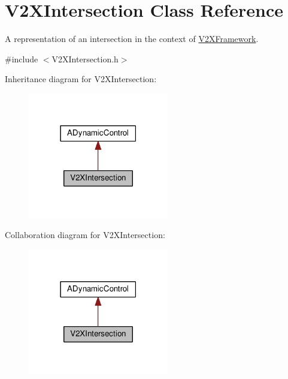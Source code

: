 \hypertarget{classV2XIntersection}{}\section{V2\+X\+Intersection Class Reference}
\label{classV2XIntersection}


A representation of an intersection in the context of \hyperlink{classV2XFramework}{V2\+X\+Framework}.  




{\ttfamily \#include $<$V2\+X\+Intersection.\+h$>$}



Inheritance diagram for V2\+X\+Intersection\+:\nopagebreak
\begin{figure}[H]
\begin{center}
\leavevmode
\includegraphics[width=174pt]{classV2XIntersection__inherit__graph}
\end{center}
\end{figure}


Collaboration diagram for V2\+X\+Intersection\+:\nopagebreak
\begin{figure}[H]
\begin{center}
\leavevmode
\includegraphics[width=174pt]{classV2XIntersection__coll__graph}
\end{center}
\end{figure}
